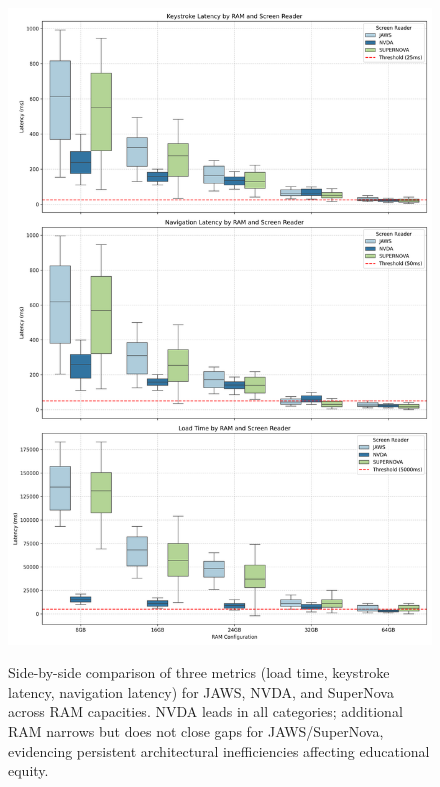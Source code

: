 \begin{figure}[htbp]
	\includegraphics[alt={Composite panel comparing boxplots of load, keystroke, and navigation latencies across RAM for JAWS, NVDA, SuperNova; NVDA consistently lowest; memory reduces but does not eliminate JAWS/SuperNova gaps.}]{images/composite_latency.png}
	\caption[Composite latency comparison]{Side-by-side comparison of three metrics (load time, keystroke latency, navigation latency) for JAWS, NVDA, and SuperNova across RAM capacities. NVDA leads in all categories; additional RAM narrows but does not close gaps for JAWS/SuperNova, evidencing persistent architectural inefficiencies affecting educational equity.}\label{fig:figure4}
	\tagstructend
\end{figure}

